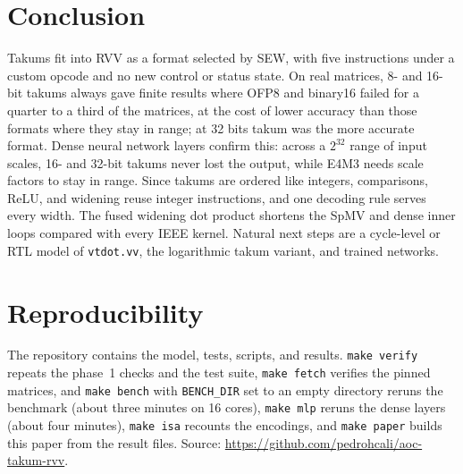 \documentclass[conference]{IEEEtran}
\newcommand{\code}[1]{\texttt{#1}}
\begin{document}
\section{Conclusion}
Takums fit into RVV as a format selected by SEW, with five instructions under a
custom opcode and no new control or status state. On \BenchMatrices{} real
matrices, 8- and 16-bit takums always gave finite results where OFP8 and
binary16 failed for a quarter to a third of the matrices, at the cost of lower
accuracy than those formats where they stay in range; at 32 bits takum was the
more accurate format. Dense neural network layers confirm this: across a
$2^{32}$ range of input scales, 16- and 32-bit takums never lost the output,
while E4M3 needs scale factors to stay in range. Since takums are ordered like
integers, comparisons, ReLU, and widening reuse integer instructions, and one
decoding rule serves every width. The fused widening dot product shortens the
SpMV and dense inner loops compared with every IEEE kernel. Natural next steps
are a cycle-level or RTL model of \code{vtdot.vv}, the logarithmic takum
variant, and trained networks.

\section*{Reproducibility}
The repository contains the model, tests, scripts, and results.
\code{make verify} repeats the phase~1 checks and the test suite, \code{make
fetch} verifies the pinned matrices, and \code{make bench} with
\code{BENCH\_DIR} set to an empty directory reruns the benchmark
(about three minutes on 16 cores), \code{make mlp} reruns the dense layers
(about four minutes), \code{make isa} recounts the encodings, and
\code{make paper} builds this paper from the result files. Source:
\url{https://github.com/pedrohcali/aoc-takum-rvv}.
\end{document}
